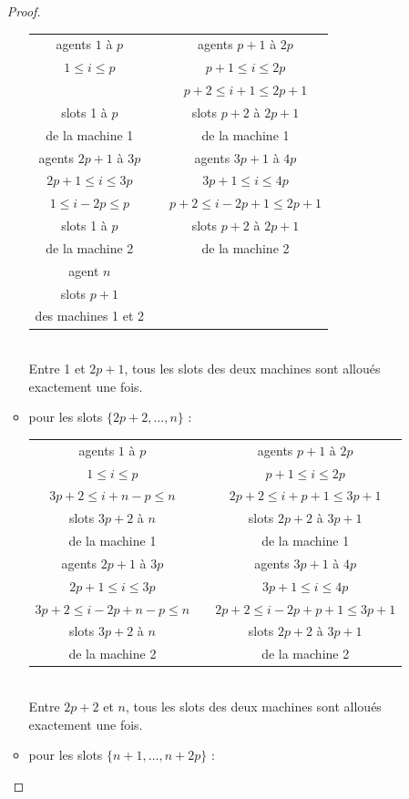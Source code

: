 \documentclass[12pt]{article}
\theoremstyle{definition}
\begin{document}
\begin{itemize}
\begin{proof}
\begin{itemize}
\begin{tabular}{ccc}
agents $1$ à $p$  & & agents $p+1$ à $2p$   \\
$1\leq i \leq p $ & & $p+1\leq i \leq 2p$   \\
				  & & $p+2\leq i+1\leq 2p+1$\\
slots 1 à $p$     & & slots $p+2$ à $2p+1$  \\
de la machine 1   & & de la machine 1       \\
\hline
agents $2p+1$ à $3p$ & & agents $3p+1$ à $4p$\\
$2p+1\leq i \leq 3p $ & & $3p+1\leq i \leq 4p$   \\
$1\leq i-2p \leq p $ & & $p+2\leq i-2p+1 \leq 2p+1$   \\
slots 1 à $p$     & & slots $p+2$ à $2p+1$  \\
de la machine 2   & & de la machine 2       \\
\hline
agent $n$ & &\\
slots $p+1$ & & \\
des machines 1 et 2&&\\
\end{tabular}\\
Entre 1 et $2p+1$, tous les slots des deux machines sont alloués exactement une fois.
\item pour les slots $\{2p+2,\dots,n\}$ :\\
\begin{tabular}{ccc}
agents $1$ à $p$  & & agents $p+1$ à $2p$   \\
$1\leq i \leq p $ & & $p+1\leq i \leq 2p$   \\
$3p+2 \leq i+n-p\leq n$ & & $2p+2\leq i+p+1\leq 3p+1$\\
slots $3p+2$ à $n$     & & slots $2p+2$ à $3p+1$  \\
de la machine 1   & & de la machine 1       \\
\hline
agents $2p+1$ à $3p$ & & agents $3p+1$ à $4p$\\
$2p+1\leq i \leq 3p $ & & $3p+1\leq i \leq 4p$   \\
$3p+2 \leq i-2p+n-p\leq n$ & & $2p+2\leq i-2p+p+1\leq 3p+1$\\
slots $3p+2$ à $n$     & & slots $2p+2$ à $3p+1$  \\
de la machine 2   & & de la machine 2       \\
\end{tabular}\\
Entre $2p+2$ et $n$, tous les slots des deux machines sont alloués exactement une fois.
\item pour les slots $\{n+1,\dots,n+2p\}$ :\\

\end{itemize}
\end{proof}
\end{itemize}
\end{document}
